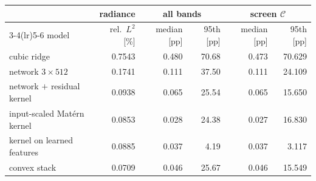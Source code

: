 \begin{tabular}{lrrrrr}
\toprule
 & radiance & \multicolumn{2}{c}{all bands} & \multicolumn{2}{c}{screen $\mathcal C$} \\
\cmidrule(lr){3-4}\cmidrule(lr){5-6}
model & rel.\ $L^2$ [\%] & median [pp] & 95th [pp] & median [pp] & 95th [pp] \\
\midrule
cubic ridge & 0.7543 & 0.480 & 70.68 & 0.473 & 70.629 \\
network $3\times512$ & 0.1741 & 0.111 & 37.50 & 0.111 & 24.109 \\
network $+$ residual kernel & 0.0938 & 0.065 & 25.54 & 0.065 & 15.650 \\
input-scaled Mat\'ern kernel & 0.0853 & 0.028 & 24.38 & 0.027 & 16.830 \\
kernel on learned features & 0.0885 & 0.037 & 4.19 & 0.037 & 3.117 \\
convex stack & 0.0709 & 0.046 & 25.67 & 0.046 & 15.549 \\
\bottomrule
\end{tabular}
